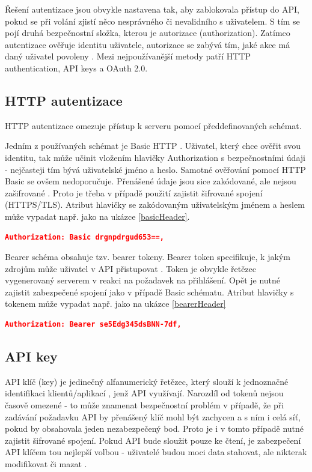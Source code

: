 \documentclass[czech, bc, kiv, he, iso690numb]{fasthesis}
\begin{document}
Řešení autentizace jsou obvykle nastavena tak, aby zablokovala přístup do API, pokud se při volání zjistí něco nesprávného či nevalidního s uživatelem. S tím se pojí druhá bezpečnostní
složka, kterou je autorizace (authorization). Zatímco autentizace ověřuje identitu uživatele, autorizace se zabývá tím, jaké akce má daný uživatel povoleny \cite{mostUsedAuthentication}. 
Mezi nejpoužívanější metody patří HTTP authentication, API keys a OAuth 2.0. 

\subsection{HTTP autentizace}
HTTP autentizace omezuje přístup k serveru pomocí předdefinovaných schémat. 

Jedním z používaných schémat je Basic HTTP \cite{mozillaHTTPAuth}. Uživatel, který chce ověřit svou identitu, tak může učinit vložením hlavičky 
Authorization s bezpečnostními údaji - nejčasteji tím bývá uživatelské jméno a heslo. 
Samotné ověřování pomocí HTTP Basic se ovšem nedoporučuje. Přenášené údaje jsou sice zakódované, ale nejsou zašifrované \cite{mozillaHTTPAuth}. Proto je třeba v případě použití zajistit šifrované spojení (HTTPS/TLS). Atribut hlavičky se zakódovaným uživatelským jménem a heslem může vypadat např. jako na ukázce \ref{basicHeader}.

\begin{lstlisting}[language=json, caption={Autorizační atribut - Basic schéma}, label=basicHeader]
	Authorization: Basic drgnpdrgud653==,
\end{lstlisting}

Bearer schéma obsahuje tzv. bearer tokeny. Bearer token specifikuje, k jakým zdrojům může uživatel v API přistupovat \cite{mostUsedAuthentication}. Token je obvykle řetězec vygenerovaný serverem v reakci na požadavek na přihlášení. Opět je nutné zajistit zabezpečené spojení jako v případě Basic schématu. Atribut hlavičky s tokenem může vypadat např. jako na ukázce \ref{bearerHeader}

\begin{lstlisting}[language=json, caption={Autorizační atribut - Bearer schéma}, label=bearerHeader]
	Authorization: Bearer se5Edg345dsBNN-7df,
\end{lstlisting}


\subsection{API key}
API klíč (key) je jedinečný alfanumerický řetězec, který slouží k jednoznačné identifikaci klientů/aplikací \cite{amazonAPIKey}, jenž API využívají. Narozdíl od tokenů
nejsou časově omezené - to může znamenat bezpečnostní problém v případě, že při zadávání požadavku API by přenášený klíč mohl být zachycen \cite{mostUsedAuthentication} a s ním i celá síť, pokud by obsahovala jeden nezabezpečený bod. Proto je i v tomto případě nutné zajistit šifrované spojení.
Pokud API bude sloužit pouze ke čtení, je zabezpečení API klíčem tou nejlepší volbou - uživatelé budou moci data stahovat, ale nikterak modifikovat či mazat \cite{mostUsedAuthentication}. 
\end{document}
